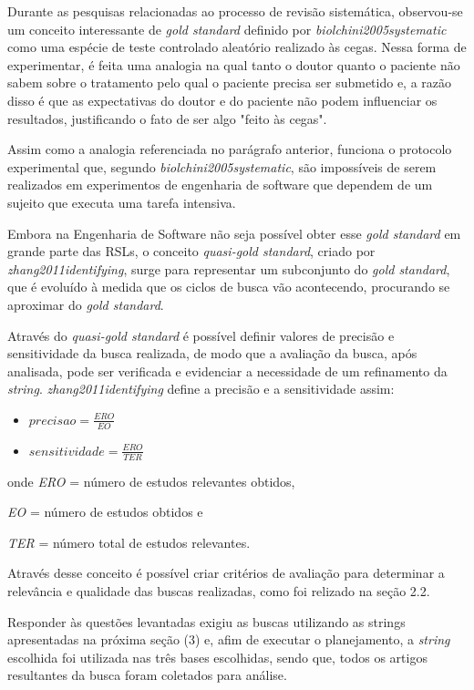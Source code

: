 Durante as pesquisas relacionadas ao processo de revisão sistemática, observou-se um conceito interessante de \textit{gold standard} definido por \textit{biolchini2005systematic} como uma espécie de teste controlado aleatório realizado às cegas. Nessa forma de experimentar, é feita uma analogia na qual tanto o doutor quanto o paciente não sabem sobre o tratamento pelo qual o paciente precisa ser submetido e, a razão disso é que as expectativas do doutor e do paciente não podem influenciar os resultados, justificando o fato de ser algo "feito às cegas". 

Assim como a analogia referenciada no parágrafo anterior, funciona o protocolo experimental que, segundo \textit{biolchini2005systematic}, são impossíveis de serem realizados em experimentos de engenharia de software que dependem de um sujeito que executa uma tarefa intensiva. 

Embora na Engenharia de Software não seja possível obter esse \textit{gold standard} em grande parte das RSLs, o conceito \textit{quasi-gold standard}, criado por \textit{zhang2011identifying}, surge para representar um subconjunto do \textit{gold standard}, que é evoluído à medida que os ciclos de busca vão acontecendo, procurando se aproximar do \textit{gold standard}.

Através do \textit{quasi-gold standard} é possível definir valores de precisão e sensitividade da busca realizada, de modo que a avaliação da busca, após analisada, pode ser verificada e evidenciar a necessidade de um refinamento da \textit{string}. \textit{zhang2011identifying} define a precisão e a sensitividade assim:

\begin{itemize}

    \item $precisao = \frac{ERO}{EO}$ 
	\item $sensitividade = \frac{ERO}{TER}$

\end{itemize}

onde \textit{ERO} = número de estudos relevantes obtidos,
		
	  \textit{EO} = número de estudos obtidos e

	   \textit{TER} = número total de estudos relevantes.

Através desse conceito é possível criar critérios de avaliação para determinar a relevância e qualidade das buscas realizadas, como foi relizado na seção 2.2.

Responder às questões levantadas exigiu as buscas utilizando as strings apresentadas na próxima seção (3) e, afim de executar o planejamento, a \textit{string} escolhida foi utilizada nas três bases escolhidas, sendo que, todos os artigos resultantes da busca foram coletados para análise. 

